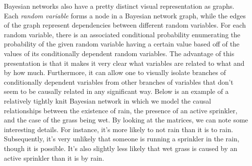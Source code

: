 \documentclass[a4paper,12pt]{article}
\begin{document}
Bayesian networks also have a pretty distinct visual representation as graphs. Each \emph{random variable} forms a node in a Bayesian network graph, while the edges of the graph represent dependencies between different random variables. For each random variable, there is an associated conditional probability enumerating the probability of the given random variable having a certain value based off of the values of its conditionally dependent random variables. The advantage of this presentation is that it makes it very clear what variables are related to what and by how much. Furthermore, it can allow one to visually isolate branches of conditionally dependent variables from other branches of variables that don't seem to be causally related in any significant way. Below is an example of a relatively tightly knit Bayesian network in which we model the causal relationships between the existence of rain, the presence of an active sprinkler, and the case of the grass being wet. By looking at the matrices, we can note some interesting details. For instance, it's more likely to not rain than it is to rain. Subsequently, it's very unlikely that someone is running a sprinkler in the rain, though it is possible. It's also slightly less likely that wet grass is caused by an active sprinkler than it is by rain.
\end{document}
